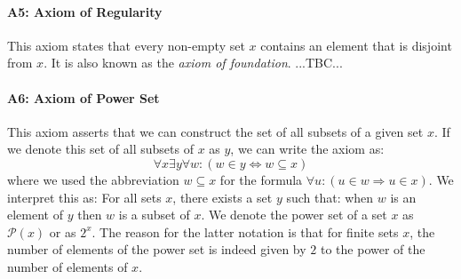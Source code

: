 
\paragraph{A5: Axiom of Regularity}
This axiom states that every non-empty set $x$ contains an element that is disjoint from $x$. It is also known as the \emph{axiom of foundation}. ...TBC...







% 

\paragraph{A6: Axiom of Power Set}
This axiom asserts that we can construct the set of all subsets of a given set $x$. If we denote this set of all subsets of $x$ as $y$, we can write the axiom as:
\begin{equation}
\forall x \exists y \forall w: (w \in y \Leftrightarrow w \subseteq x)
\end{equation}
where we used the abbreviation $w \subseteq x$ for the formula $\forall u: (u \in w \Rightarrow u \in x)$. We interpret this as: For all sets $x$, there exists a set $y$ such that: when $w$ is an element of $y$ then $w$ is a subset of $x$. We denote the power set of a set $x$ as $\mathcal{P}(x)$ or as $2^x$. The reason for the latter notation is that for finite sets $x$, the number of elements of the power set is indeed given by $2$ to the power of the number of elements of $x$.

